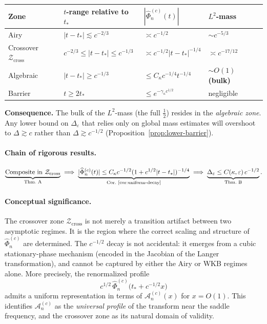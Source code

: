 \documentclass[12pt,a4paper]{amsart}
\theoremstyle{definition}
\theoremstyle{remark}
\newcommand{\Zcross}{\mathcal{Z}_{\mathrm{cross}}}
\begin{document}
\begin{center}
\renewcommand{\arraystretch}{1.4}
\begin{tabular}{llll}
\toprule
Zone & $t$-range relative to $t_*$
& $|\widehat{\Phi}_n^{(c)}(t)|$
& $L^2$-mass \\
\midrule
Airy & $|t-t_*| \lesssim c^{-2/3}$
& $\asymp c^{-1/2}$
& $\sim c^{-5/3}$ \\
Crossover $\Zcross$
& $c^{-2/3} \le |t-t_*| \le c^{-1/3}$
& $\asymp c^{-1/2}|t-t_*|^{-1/4}$
& $\asymp c^{-17/12}$ \\
Algebraic & $|t-t_*| \ge c^{-1/3}$
& $\le C_\kappa c^{-1/4}t^{-1/4}$
& $\sim O(1)$ \textbf{(bulk)} \\
Barrier & $t \ge 2t_*$
& $\le e^{-\gamma_\kappa c^{1/2}}$
& negligible \\
\bottomrule
\end{tabular}
\end{center}

\noindent\textbf{Consequence.}
The bulk of the $L^2$-mass (the full $\tfrac{1}{2}$)
resides in the \emph{algebraic zone}.
Any lower bound on $\Delta_\varepsilon$
that relies only on global mass estimates
will overshoot to $\Delta \gtrsim c$
rather than $\Delta \gtrsim c^{-1/2}$
(Proposition~\ref{prop:lower-barrier}).

\paragraph{Chain of rigorous results.}
\[
\underbrace{\text{Composite in }\Zcross}
_{\text{Thm.~A}}
\;\Longrightarrow\;
\underbrace{|\widehat{\Phi}_n^{(c)}(t)|
\le C_\kappa c^{-1/2}(1+c^{1/2}|t-t_*|)^{-1/4}}
_{\text{Cor.~\ref{cor:uniform-decay}}}
\;\Longrightarrow\;
\underbrace{\Delta_\varepsilon \le C(\kappa,\varepsilon)\,c^{-1/2}}
_{\text{Thm.~B}}.
\]

\paragraph{Conceptual significance.}
The crossover zone $\Zcross$ is not merely a
transition artifact between two asymptotic regimes.
It is the region where the correct scaling and
structure of $\widehat{\Phi}_n^{(c)}$ are determined.
The $c^{-1/2}$ decay is not accidental: it emerges
from a cubic stationary-phase mechanism (encoded in the
Jacobian of the Langer transformation), and cannot be
captured by either the Airy or WKB regimes alone.
More precisely, the renormalized profile
\[
  c^{1/2}\,\widehat{\Phi}_n^{(c)}\!\bigl(t_* + c^{-1/2}x\bigr)
\]
admits a uniform representation in terms of
$\mathcal{A}_n^{(c)}(x)$ for $x = O(1)$.
This identifies $\mathcal{A}_n^{(c)}$ as the
\emph{universal profile} of the transform near the
saddle frequency, and the crossover zone as its
natural domain of validity.
\end{document}
